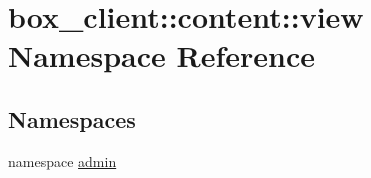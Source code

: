 \hypertarget{namespacebox__client_1_1content_1_1view}{
\section{box\_\-client::content::view Namespace Reference}
\label{namespacebox__client_1_1content_1_1view}
}
\subsection*{Namespaces}
\begin{DoxyCompactItemize}
\item 
namespace \hyperlink{namespacebox__client_1_1content_1_1view_1_1admin}{admin}
\end{DoxyCompactItemize}
